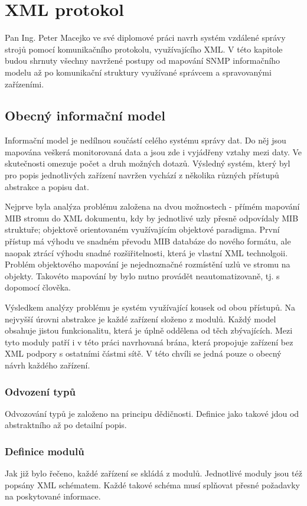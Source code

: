 \chapter{XML protokol}
\label{kap_xml}
Pan Ing. Peter Macejko ve své diplomové práci navrh systém vzdálené správy strojů pomocí komunikačního protokolu, využívajícího XML. V této kapitole budou shrnuty všechny 
navržené postupy od mapování SNMP informačního modelu až po komunikační struktury využívané správcem a spravovanými zařízeními.

\section{Obecný informační model}
Informační model je nedílnou součástí celého systému správy dat. Do něj jsou mapována veškerá monitorovaná data a jsou zde i vyjádřeny vztahy mezi daty. Ve skutečnosti
omezuje počet a druh možných dotazů. Výsledný systém, který byl pro popis jednotlivých zařízení navržen vychází z několika různých přístupů abstrakce a popisu dat.

Nejprve byla analýza problému založena na dvou možnostech - přímém mapování MIB stromu do XML dokumentu, kdy by jednotlivé uzly přesně odpovídaly MIB struktuře; objektově
orientovaném využívajícím objektové paradigma. První přístup má výhodu ve snadném převodu MIB databáze do nového formátu, ale naopak ztrácí výhodu snadné rozšiřitelnosti,
která je vlastní XML technolgoii. Problém objektového mapování je nejednoznačné rozmístění uzlů ve stromu na objekty. Takovéto mapování by bylo nutno provádět
neautomatizovaně, tj. s dopomocí člověka.

Výsledkem analýzy problému je systém využívající kousek od obou přístupů. Na nejvyšší úrovni abstrakce je každé zařízení složeno z modulů. Každý model obsahuje jistou
funkcionalitu, která je úplně oddělena od těch zbývajících. Mezi tyto moduly patří i v této práci navrhovaná brána, která propojuje zařízení bez XML podpory s ostatními
částmi sítě. V této chvíli se jedná pouze o obecný návrh každého zařízení.

\subsection{Odvození typů}
Odvozování typů je založeno na principu dědičnosti. Definice jako takové jdou od abstraktního až po detailní popis.

\subsection{Definice modulů}
Jak již bylo řečeno, každé zařízení se skládá z modulů. Jednotlivé moduly jsou též popsány XML schématem. Každé takové schéma
musí splňovat přesné požadavky na poskytované informace.

